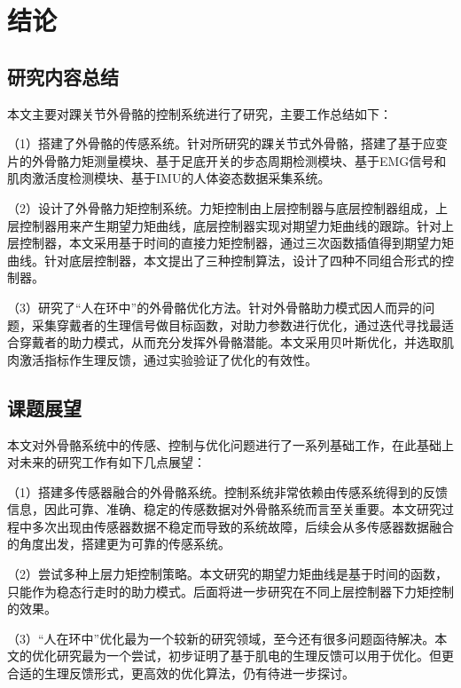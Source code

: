 \chapter{结论}
\section{研究内容总结}

本文主要对踝关节外骨骼的控制系统进行了研究，主要工作总结如下：

（1）搭建了外骨骼的传感系统。针对所研究的踝关节式外骨骼，搭建了基于应变片的外骨骼力矩测量模块、基于足底开关的步态周期检测模块、基于EMG信号和肌肉激活度检测模块、基于IMU的人体姿态数据采集系统。

（2）设计了外骨骼力矩控制系统。力矩控制由上层控制器与底层控制器组成，上层控制器用来产生期望力矩曲线，底层控制器实现对期望力矩曲线的跟踪。针对上层控制器，本文采用基于时间的直接力矩控制器，通过三次函数插值得到期望力矩曲线。针对底层控制器，本文提出了三种控制算法，设计了四种不同组合形式的控制器。

（3）研究了“人在环中”的外骨骼优化方法。针对外骨骼助力模式因人而异的问题，采集穿戴者的生理信号做目标函数，对助力参数进行优化，通过迭代寻找最适合穿戴者的助力模式，从而充分发挥外骨骼潜能。本文采用贝叶斯优化，并选取肌肉激活指标作生理反馈，通过实验验证了优化的有效性。

\section{课题展望}

本文对外骨骼系统中的传感、控制与优化问题进行了一系列基础工作，在此基础上对未来的研究工作有如下几点展望：

（1）搭建多传感器融合的外骨骼系统。控制系统非常依赖由传感系统得到的反馈信息，因此可靠、准确、稳定的传感数据对外骨骼系统而言至关重要。本文研究过程中多次出现由传感器数据不稳定而导致的系统故障，后续会从多传感器数据融合的角度出发，搭建更为可靠的传感系统。

（2）尝试多种上层力矩控制策略。本文研究的期望力矩曲线是基于时间的函数，只能作为稳态行走时的助力模式。后面将进一步研究在不同上层控制器下力矩控制的效果。

（3）“人在环中”优化最为一个较新的研究领域，至今还有很多问题函待解决。本文的优化研究最为一个尝试，初步证明了基于肌电的生理反馈可以用于优化。但更合适的生理反馈形式，更高效的优化算法，仍有待进一步探讨。